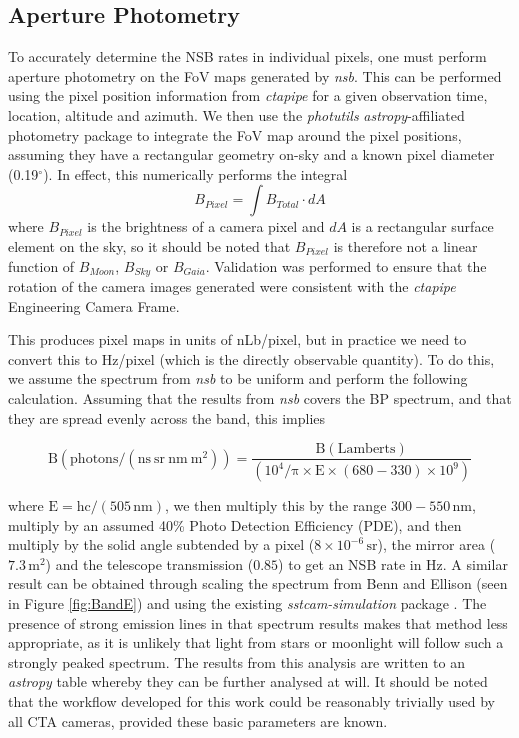 \subsection{Aperture Photometry}
To accurately determine the NSB rates in individual pixels, one must perform aperture photometry on the FoV maps generated by \textit{nsb}. This can be performed using the pixel position information from \textit{ctapipe} \cite{ctapipe2} for a given observation time, location, altitude and azimuth. We then use the \textit{photutils} \textit{astropy}-affiliated \cite{astropy:2018} photometry package \cite{photutils} to integrate the FoV map around the pixel positions, assuming they have a rectangular geometry on-sky and a known pixel diameter (0.19$^{\circ}$). In effect, this numerically performs the integral
\begin{equation}
    B_{Pixel}=\int B_{Total} \cdot dA
\end{equation}
where $B_{Pixel}$ is the brightness of a camera pixel and $dA$ is a rectangular surface element on the sky, so it should be noted that $B_{Pixel}$ is therefore not a linear function of $B_{Moon}$, $B_{Sky}$ or $B_{Gaia}$. Validation was performed to ensure that the rotation of the camera images generated were consistent with the \textit{ctapipe} Engineering Camera Frame.

This produces pixel maps in units of nLb/pixel, but in practice we need to convert this to Hz/pixel (which is the directly observable quantity). To do this, we assume the spectrum from \textit{nsb} to be uniform and perform the following calculation. Assuming that the results from \textit{nsb} covers the BP spectrum, and that they are spread evenly across the band, this implies

\begin{equation}
    \mathrm{B (photons/(ns\ sr\ nm\ m^2) )=\frac{B (Lamberts)}{(10^4 / \pi \times E \times (680-330) \times 10^9)}}
\end{equation}

where $\mathrm{E=hc/(505\,nm)}$, we then multiply this by the range $\mathrm{300-550\,nm}$, multiply by an assumed 40\% Photo Detection Efficiency (PDE), and then multiply by the solid angle subtended by a pixel ($\mathrm{8 \times 10^{-6}\,sr}$), the mirror area ($\mathrm{7.3\,m^2}$) and the telescope transmission ($0.85$) to get an NSB rate in Hz. A similar result can be obtained through scaling the spectrum from Benn and Ellison \cite{BandE} (seen in Figure \ref{fig:BandE}) and using the existing \textit{sstcam-simulation} package \cite{sstcamsimulation}. The presence of strong emission lines in that spectrum results makes that method less appropriate, as it is unlikely that light from stars or moonlight will follow such a strongly peaked spectrum. The results from this analysis are written to an \textit{astropy} table whereby they can be further analysed at will. It should be noted that the workflow developed for this work could be reasonably trivially used by all CTA cameras, provided these basic parameters are known.

